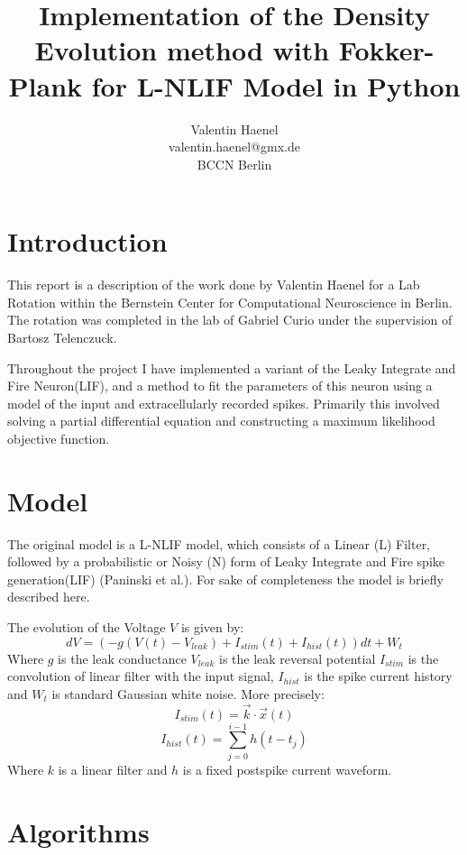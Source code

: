 \documentclass[10pt]{article}
\title{Implementation of the Density Evolution method with
Fokker-Plank for L-NLIF Model in Python}
\author{Valentin Haenel \\
valentin.haenel@gmx.de \\
BCCN Berlin}
\begin{document}
 

\maketitle

\section{Introduction}

This report is a description of the work done by Valentin Haenel
for a Lab Rotation within the Bernstein Center for Computational
Neuroscience in Berlin. The rotation was completed in the lab of Gabriel
Curio under the supervision of Bartosz Telenczuck. 

Throughout the project I have implemented a variant of the Leaky
Integrate and Fire Neuron(LIF), and a method to fit the parameters of this
neuron using a model of the input and extracellularly recorded spikes.
Primarily this involved solving a partial differential equation and constructing
a maximum likelihood objective function. 


\section{Model}
The original model is a L-NLIF model, which consists of a Linear
(L) Filter, followed by a probabilistic or Noisy (N) form of Leaky
Integrate and Fire spike generation(LIF) (Paninski et
al.\cite{PaninskiPillowSimoncelli}). For sake of completeness the
model is briefly described here.

The evolution of the Voltage $V$ is given by:
\begin{equation}
    dV = (-g(V(t) -V_{leak}) +I_{stim}(t) + I_{hist}(t)) dt + W_{t}
\end{equation}
Where $g$ is the leak conductance $V_{leak}$ is the leak reversal
potential $I_{stim}$ is the convolution of linear filter with the
input signal, $I_{hist}$ is the spike current history and $W_t$ is
standard Gaussian white noise. More precisely:
\begin{equation}
    I_{stim}(t) = \vec{k} \cdot  \vec{x}(t) 
\end{equation}
\begin{equation}
    I_{hist}(t) = \sum_{j=0}^{i-1}h(t-t_j)
\end{equation}
Where $k$ is a linear filter and $h$ is a fixed postspike current waveform. 

\section{Algorithms}
\end{document}
